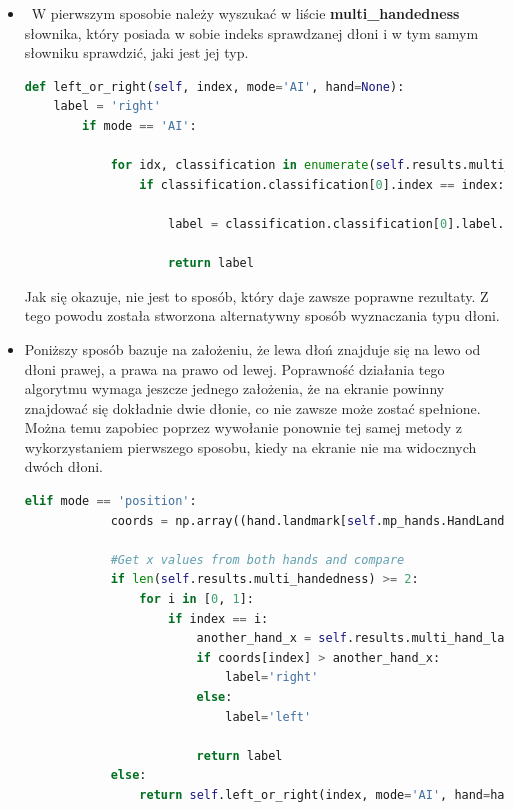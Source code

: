 \begin{itemize}
    \item \quad W pierwszym sposobie należy wyszukać w liście \textbf{multi\_handedness} słownika, który posiada w sobie indeks sprawdzanej dłoni i w tym samym słowniku sprawdzić, jaki jest jej typ. \newline

    \begin{lstlisting}[language=python, style=programming, captionpos=b, caption={Określenie typu dłoni -- Sposób nr 1}]
def left_or_right(self, index, mode='AI', hand=None):
    label = 'right'
        if mode == 'AI':
            
            for idx, classification in enumerate(self.results.multi_handedness):
                if classification.classification[0].index == index:

                    label = classification.classification[0].label.lower()

                    return label
    \end{lstlisting}

    \quad Jak się okazuje, nie jest to sposób, który daje zawsze poprawne rezultaty. Z tego powodu została stworzona alternatywny sposób wyznaczania typu dłoni. 

    \item \quad Poniższy sposób bazuje na założeniu, że lewa dłoń znajduje się na lewo od dłoni prawej, a prawa na prawo od lewej. Poprawność działania tego algorytmu wymaga jeszcze jednego założenia, że na ekranie powinny znajdować się dokładnie dwie dłonie, co nie zawsze może zostać spełnione. Można temu zapobiec poprzez wywołanie ponownie tej samej metody z wykorzystaniem pierwszego sposobu, kiedy na ekranie nie ma widocznych dwóch dłoni. \newline

    \begin{lstlisting}[language=python, style=programming, captionpos=b, caption={Określenie typu dłoni -- Sposób nr 2}]
    elif mode == 'position':
            coords = np.array((hand.landmark[self.mp_hands.HandLandmark.WRIST].x, hand.landmark[self.mp_hands.HandLandmark.WRIST].y))

            #Get x values from both hands and compare
            if len(self.results.multi_handedness) >= 2:
                for i in [0, 1]:
                    if index == i:
                        another_hand_x = self.results.multi_hand_landmarks[1-index].landmark[self.mp_hands.HandLandmark.WRIST].x
                        if coords[index] > another_hand_x:
                            label='right'
                        else:
                            label='left' 

                        return label
            else:
                return self.left_or_right(index, mode='AI', hand=hand)
    \end{lstlisting}
\end{itemize}

